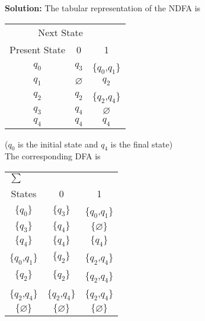\documentclass [10pt,a4paper,tikz] {book}
\let\emptyset\varnothing
\begin{document}
\textbf{Solution:} The tabular representation of the NDFA is

\begin{center}

\begin{tabular}{ccc}
\toprule
\multicolumn{2}{r}{Next State} \\
\cmidrule(r){2-3}
 Present State & 0 & 1 \\
    \midrule
    ${q}_{0}$ & ${q}_{3}$ & $\{{q}_{0}$,${q}_{1}\}$ \\
    ${q}_{1}$ & $\emptyset$ & ${q}_{2}$\\
    ${q}_{2}$& ${q}_{2}$ & $\{{q}_{2}$,${q}_{4}\}$ \\
    ${q}_{3}$ & ${q}_{4}$ & $\emptyset$ \\
    ${q}_{4}$& ${q}_{4}$ & ${q}_{4}$\\

    \bottomrule


\end{tabular}

\end{center}
(${q}_{0}$ is the initial state and ${q}_{4}$ is the final state)\\
The corresponding DFA is

\begin{center}

\begin{tabular}{ccc}


\toprule
\multicolumn{3}{l}{$\sum$} \\
\cmidrule(r){1-1}
 States & 0 & 1 \\
    \midrule
    $\{{q}_{0}\}$ & $\{{q}_{3}\}$ & $\{{q}_{0}$,${q}_{1}\}$ \\
    $\{{q}_{3}\}$ & $\{{q}_{4}\}$ & $\{\emptyset\}$\\
    $\{{q}_{4}\}$& $\{{q}_{4}\}$ & $\{{q}_{4}\}$ \\
    $\{{q}_{0}$,${q}_{1}\}$ & $\{{q}_{2}\}$ & $\{{q}_{2}$,${q}_{4}\}$ \\
    $\{{q}_{2}\}$ & $\{{q}_{2}\}$ & $\{{q}_{2}$,${q}_{4}\}$ \\
    $\{{q}_{2}$,${q}_{4}\}$ & $\{{q}_{2}$,${q}_{4}\}$ & $\{{q}_{2}$,${q}_{4}\}$ \\
    $\{\emptyset\}$ & $\{\emptyset\}$ & $\{\emptyset\}$\\
    \bottomrule


\end{tabular}

\end{center}
\end{document}
